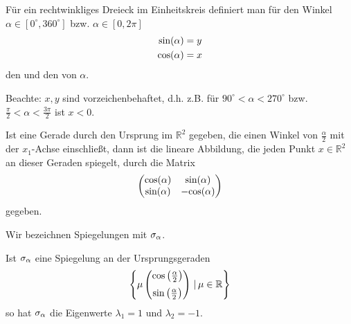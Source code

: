 \begin{center}
\end{center}
Für ein rechtwinkliges Dreieck im Einheitskreis definiert man für den Winkel $\alpha \in [0^{\circ}, 360^{\circ}]$ bzw. $\alpha \in [0, 2\pi]$
\begin{align*}
    \text{sin}(\alpha) &= y \\
    \text{cos}(\alpha) &= x
\end{align*}
den  und den  von $\alpha$.

Beachte: $x, y$ sind vorzeichenbehaftet, d.h. z.B. für $90^{\circ} < \alpha < 270^{\circ}$ bzw. $\frac{\pi}{2} < \alpha < \frac{3\pi}{2}$ ist $x < 0$.

Ist eine Gerade durch den Ursprung im $\mathbb{R}^2$ gegeben, die einen Winkel von $\frac{\alpha}{2}$ mit der $x_1$-Achse einschließt, dann ist die lineare Abbildung, die jeden Punkt $x \in \mathbb{R}^2$ an dieser Geraden spiegelt, durch die Matrix
\begin{align*}
    \begin{pmatrix}
        \text{cos}(\alpha) & \text{sin}(\alpha) \\
        \text{sin}(\alpha) & -\text{cos}(\alpha)
    \end{pmatrix}
\end{align*}
gegeben.


Wir bezeichnen Spiegelungen mit $\sigma_{\alpha}$.

Ist $\sigma_{\alpha}$ eine Spiegelung an der Ursprungsgeraden
\begin{align*}
    \left\{\mu\begin{pmatrix}
        \text{cos}\left(\frac{\alpha}{2}\right) \\[2mm]
        \text{sin}\left(\frac{\alpha}{2}\right)
    \end{pmatrix}\,|\,\mu \in \mathbb{R}\right\}
\end{align*}
so hat $\sigma_{\alpha}$ die Eigenwerte $\lambda _1 = 1$ und $\lambda _2 = -1$.

